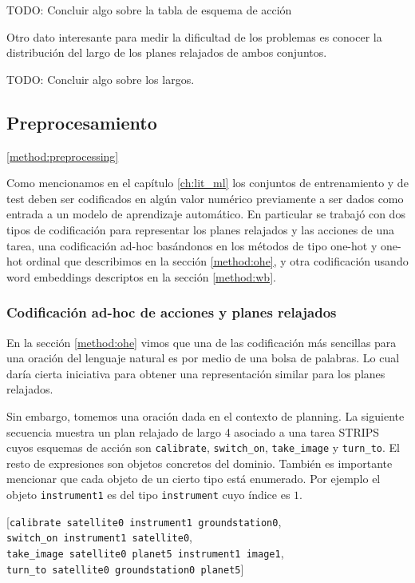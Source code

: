 TODO: Concluir algo sobre la tabla de esquema de acción

Otro dato interesante para medir la dificultad de los problemas es conocer la distribución del largo de los planes relajados de ambos conjuntos.

TODO: Concluir algo sobre los largos.

\subsection{Preprocesamiento}
\ref{method:preprocessing}

Como mencionamos en el capítulo \ref{ch:lit_ml} los conjuntos de entrenamiento y de test deben ser codificados en algún valor numérico previamente a ser dados como entrada a un modelo de aprendizaje automático. En particular se trabajó con dos tipos de codificación para representar los planes relajados y las acciones de una tarea, una codificación ad-hoc basándonos en los métodos de tipo one-hot y one-hot ordinal que describimos en la sección \ref{method:ohe}, y otra codificación usando word embeddings descriptos en la sección \ref{method:wb}.

\subsubsection{Codificación ad-hoc de acciones y planes relajados}
\label{method:vectorization}

En la sección \ref{method:ohe} vimos que una de las codificación más sencillas para una oración del lenguaje natural es por medio de una bolsa de palabras. Lo cual daría cierta iniciativa para obtener una representación similar para los planes relajados.

Sin embargo, tomemos una oración dada en el contexto de planning. La siguiente secuencia muestra un plan relajado de largo 4 asociado a una tarea STRIPS cuyos esquemas de acción son \verb|calibrate|, \verb|switch_on|, \verb|take_image| y \verb|turn_to|. El resto de
expresiones son objetos concretos del dominio. También es importante mencionar
que cada objeto de un cierto tipo está enumerado. Por ejemplo el objeto
\verb|instrument1| es del tipo \verb|instrument| cuyo índice es $1$. 

\begin{center}
    [\verb|calibrate satellite0 instrument1 groundstation0|, \\
    \verb|switch_on instrument1 satellite0|, \\
    \verb|take_image satellite0 planet5 instrument1 image1|, \\
    \verb|turn_to satellite0 groundstation0 planet5|] \\
\end{center}

